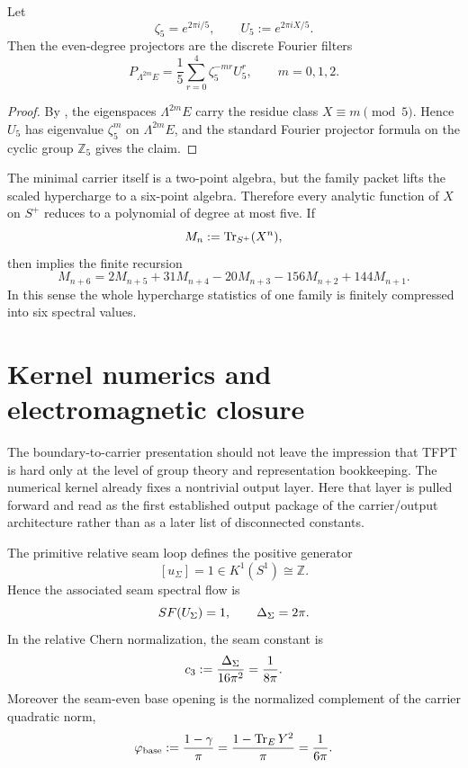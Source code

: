 \begin{corollary}
\label{cor:family-degree-filters}
Let
\[
\zeta_5=e^{2\pi i/5},
\qquad
U_5:=e^{2\pi iX/5}.
\]
Then the even-degree projectors are the discrete Fourier filters
\[
P_{\Lambda^{2m}E}
=
\frac15\sum_{r=0}^{4}\zeta_5^{-mr}U_5^r,
\qquad
m=0,1,2.
\]
\end{corollary}

\begin{proof}
By , the eigenspaces $\Lambda^{2m}E$ carry the residue class $X\equiv m\pmod 5$. Hence $U_5$ has eigenvalue $\zeta_5^m$ on $\Lambda^{2m}E$, and the standard Fourier projector formula on the cyclic group $\mathbb Z_5$ gives the claim.
\end{proof}

\begin{remark}
The minimal carrier itself is a two-point algebra, but the family packet lifts the scaled hypercharge to a six-point algebra. Therefore every analytic function of $X$ on $S^+$ reduces to a polynomial of degree at most five. If
\[
M_n:=\operatorname{Tr}_{S^+}(X^n),
\]
then  implies the finite recursion
\[
M_{n+6}
=
2M_{n+5}+31M_{n+4}-20M_{n+3}-156M_{n+2}+144M_{n+1}.
\]
In this sense the whole hypercharge statistics of one family is finitely compressed into six spectral values.
\end{remark}

\section{Kernel numerics and electromagnetic closure}

The boundary-to-carrier presentation should not leave the impression that TFPT is hard only at the level of group theory and representation bookkeeping. The numerical kernel already fixes a nontrivial output layer. Here that layer is pulled forward and read as the first established output package of the carrier/output architecture rather than as a later list of disconnected constants.

\begin{theorem}
\label{thm:primitive-seam-generator}
The primitive relative seam loop defines the positive generator
\[
[u_\Sigma]=1\in K^1(S^1)\cong \mathbb Z.
\]
Hence the associated seam spectral flow is
\[
SF(U_\Sigma)=1,
\qquad
\Delta_\Sigma=2\pi.
\]
In the relative Chern normalization, the seam constant is
\[
c_3:=\frac{\Delta_\Sigma}{16\pi^2}=\frac{1}{8\pi}.
\]
Moreover the seam-even base opening is the normalized complement of the carrier quadratic norm,
\[
\varphi_{\mathrm{base}}
:=
\frac{1-\gamma}{\pi}
=
\frac{1-\operatorname{Tr}_EY^2}{\pi}
=
\frac{1}{6\pi}.
\]
\end{theorem}

